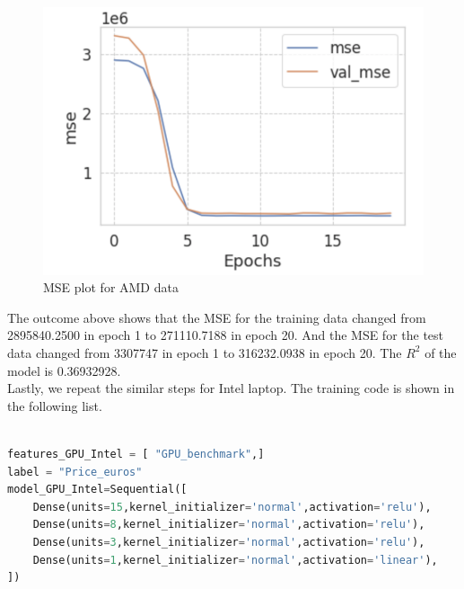 \documentclass{scrartcl}
\begin{document}
\begin{figure}[H]
	\begin{center}
		\includegraphics[scale=1.0]{Graphics/Neural Network Images/NN17.png}
	\end{center}
	\caption{MSE plot for AMD data}
	\label{fig:NN17}
\end{figure}

\noindent The outcome above shows that the MSE for the training data changed from 2895840.2500 in epoch 1 to 271110.7188 in epoch 20. And the MSE for the test data changed from 3307747 in epoch 1 to 316232.0938 in epoch 20. The $R^2$ of the model is 0.36932928. \\








\noindent Lastly, we repeat the similar steps for Intel laptop. The training code is shown in the following list. 

\begin{lstlisting}[language=Python, caption= Code for training Intel data, basicstyle=\tiny,captionpos=b]

features_GPU_Intel = [ "GPU_benchmark",]
label = "Price_euros"
model_GPU_Intel=Sequential([
    Dense(units=15,kernel_initializer='normal',activation='relu'),
    Dense(units=8,kernel_initializer='normal',activation='relu'),
    Dense(units=3,kernel_initializer='normal',activation='relu'),
    Dense(units=1,kernel_initializer='normal',activation='linear'),
])
\end{lstlisting}
\end{document}
